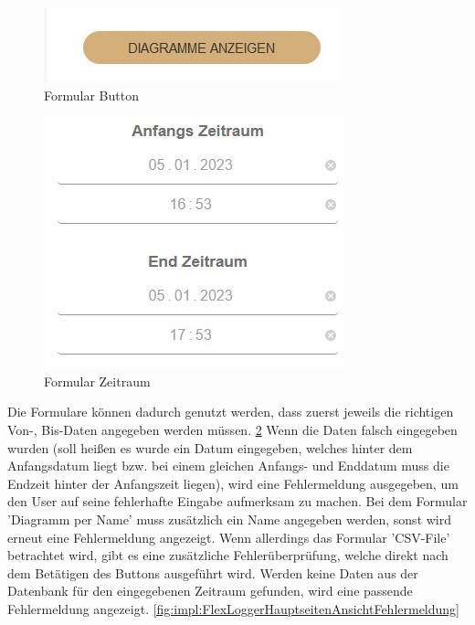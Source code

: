 \begin{figure}
    \centering
    \includegraphics[scale=1]{pics/FlexLoggerWebsiteFormulare_button.jpg}
    \caption{Formular Button}
    \label{fig:impl:FlexLoggerHauptseitenAnsichtButton}
\end{figure}
 
\begin{figure}
    \centering
    \includegraphics[scale=1]{pics/FlexLoggerWebsiteFormulare_zeitraum.jpg}
    \caption{Formular Zeitraum}
    \label{fig:impl:FlexLoggerHauptseitenAnsichtZeitraum}
\end{figure}

Die Formulare können dadurch genutzt werden, dass zuerst jeweils die richtigen Von-, Bis-Daten angegeben werden müssen. \ref{fig:impl:FlexLoggerHauptseitenAnsichtZeitraum} Wenn die Daten falsch eingegeben wurden (soll heißen es wurde ein Datum eingegeben, welches hinter dem Anfangsdatum liegt bzw. bei einem gleichen Anfangs- und Enddatum muss die Endzeit hinter der Anfangszeit liegen), wird eine Fehlermeldung ausgegeben, um den User auf seine fehlerhafte Eingabe aufmerksam zu machen. Bei dem Formular 'Diagramm per Name' muss zusätzlich ein Name angegeben werden, sonst wird erneut eine Fehlermeldung angezeigt. Wenn allerdings das Formular 'CSV-File' betrachtet wird, gibt es eine zusätzliche Fehlerüberprüfung, welche direkt nach dem Betätigen des Buttons ausgeführt wird. Werden keine Daten aus der Datenbank für den eingegebenen Zeitraum gefunden, wird eine passende Fehlermeldung angezeigt. \ref{fig:impl:FlexLoggerHauptseitenAnsichtFehlermeldung}
 
